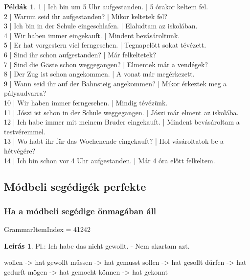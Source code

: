\documentclass{article}
\theoremstyle{definition}
\newtheorem*{exmp}{Példák}
\newtheorem*{desc}{Leírás}
\begin{document}
\begin{exmp}
1 | Ich bin um 5 Uhr aufgestanden. | 5 órakor keltem fel.\\
2 | Warum seid ihr aufgestanden? | Mikor keltetek fel?\\
3 | Ich bin in der Schule eingeschlafen. | Elaludtam az iskolában.\\
4 | Wir haben immer eingekauft. | Mindent bevásároltunk.\\
5 | Er hat vorgestern viel ferngesehen. | Tegnapelőtt sokat tévézett.\\
6 | Sind ihr schon aufgestanden? | Már felkeltetek?\\
7 | Sind die Gäste schon weggegangen? | Elmentek már a vendégek?\\
8 | Der Zug ist schon angekommen. | A vonat már megérkezett.\\
9 | Wann seid ihr auf der Bahnsteig angekommen? | Mikor érkeztek meg a pályaudvarra?\\
10 | Wir haben immer ferngesehen. | Mindig tévézünk.\\
11 | Jószi ist schon in der Schule weggegangen. | Jószi már elment az iskolába.\\
12 | Ich habe immer mit meinem Bruder eingekauft. | Mindent bevásároltam a testvéremmel.\\
13 | Wo habt ihr für das Wochenende eingekauft? | Hol vásároltatok be a hétvégére?\\
14 | Ich bin schon vor 4 Uhr aufgestanden. | Már 4 óra előtt felkeltem.\\
\end{exmp}

\subsection{Módbeli segédigék perfekte}

\subsubsection{Ha a módbeli segédige önmagában áll}

GrammarItemIndex = 41242

\begin{desc}
Pl.: Ich habe das nicht gewollt. - Nem akartam azt.

wollen -> hat gewollt
müssen -> hat gemusst
sollen -> hat gesollt
dürfen -> hat gedurft
mögen -> hat gemocht
können -> hat gekonnt
\end{desc}
\end{document}
